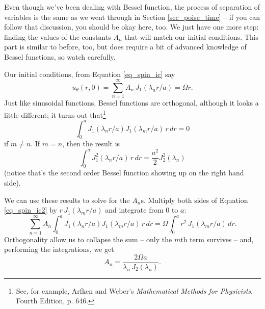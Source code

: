 Even though we've been dealing with Bessel function, the process of separation of variables is the same as we went through in Section \ref{sec_poise_time} -- if you can follow that discussion, you should be okay here, too.  We just have one more step:  finding the values of the constants $A_n$ that will match our initial conditions.  This part is similar to before, too, but does require a bit of advanced knowledge of Bessel functions, so watch carefully.

Our initial conditions, from Equation \ref{eq_spin_ic} say
\begin{equation}
\label{eq_spin_ic2}
u_\theta(r,0) =  \sum_{n=1}^\infty A_n \, J_1(\lambda_n r / a) = \Omega r.
\end{equation}
Just like sinusoidal functions, Bessel functions are orthogonal, although it looks a little different; it turns out that\footnote{See, for example, Arfken and Weber's \emph{Mathematical Methods for Physicists}, Fourth Edition, p. 646.}
\[
\int_0^a J_1(\lambda_n r / a) J_1(\lambda_m r /a) \, r\, dr = 0
\]
if $m \neq n$.  If $m = n$, then the result is
\[
\int_0^a J_1^2(\lambda_n r / a) \, r \, dr = \frac{a^2}{2} J_2^2(\lambda_n)
\]
(notice that's the second order Bessel function showing up on the right hand side).

We can use these results to solve for the $A_n$s.  Multiply both sides of Equation \ref{eq_spin_ic2} by $r \, J_1(\lambda_m r /a)$ and integrate from $0$ to $a$:
\[
\sum_{n=1}^\infty A_n \int_0^a J_1(\lambda_n r / a) J_1(\lambda_m r /a) \, r\, dr = \Omega \int_0^a r^2 \, J_1(\lambda_m r/a) \, dr.
\]
Orthogonality allow us to collapse the sum -- only the $m$th term survives -- and, performing the integrations, we get
\[
A_n = \frac{2 \Omega a}{\lambda_n \, J_2(\lambda_n)}.
\]

